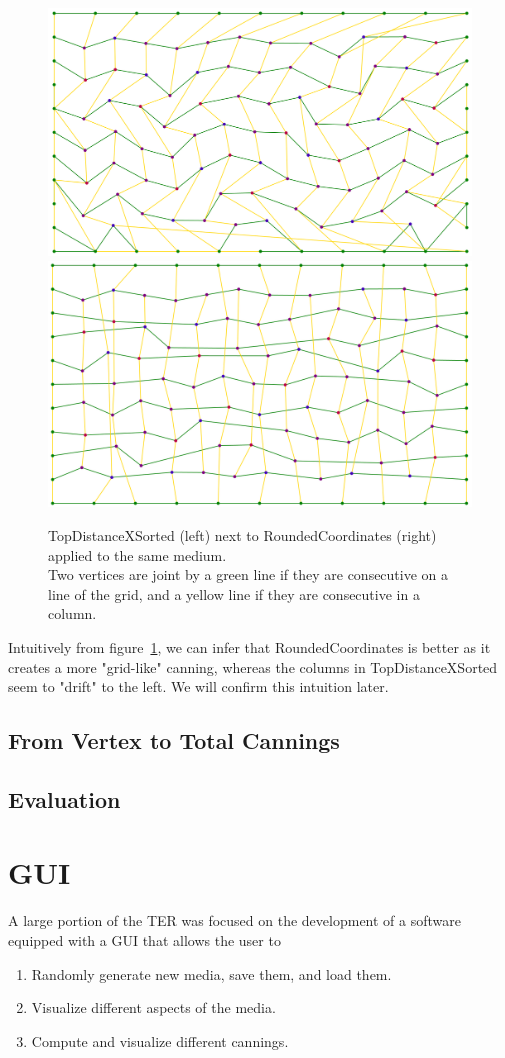 \documentclass{article}
\begin{document}
\begin{figure}[H]
	\centering\includegraphics[width=0.45\linewidth]{assets/TopDistanceXSorted.png}
	\centering\includegraphics[width=0.45\linewidth]{assets/RoundedCoordinates.png}
	\caption{TopDistanceXSorted (left) next to RoundedCoordinates (right) applied to the same medium.\\
	Two vertices are joint by a green line if they are consecutive on a line of the grid, and a yellow line if they are consecutive in a column.}
	\label{fig:topdist_vs_rounded}
\end{figure}

Intuitively from figure~\ref{fig:topdist_vs_rounded}, we can infer that RoundedCoordinates is better as it creates a more "grid-like" canning, whereas the columns in TopDistanceXSorted seem to "drift" to the left. We will confirm this intuition later.

\subsection{From Vertex to Total Cannings}



\subsection{Evaluation}

\section{GUI}

A large portion of the TER was focused on the development of a software equipped with a GUI that allows the user to
\begin{enumerate}
	\item Randomly generate new media, save them, and load them.
	\item Visualize different aspects of the media.
	\item Compute and visualize different cannings.
\end{enumerate}
$ $
\end{document}
